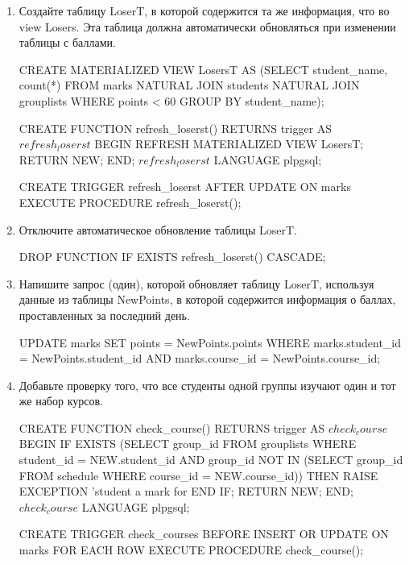 \documentclass[10pt, a4paper]{article}
\begin{document}
\begin{enumerate}
	\item {Создайте таблицу \textsf{LoserT}, в которой содержится та же информация, что во view \textsf{Losers}. Эта таблица должна автоматически обновляться при изменении таблицы с баллами.

	\begin{sql}
CREATE MATERIALIZED VIEW LosersT AS
	(SELECT student_name, count(*) FROM
	marks NATURAL JOIN students NATURAL JOIN grouplists
		WHERE points < 60 GROUP BY student_name);

CREATE FUNCTION refresh_loserst() RETURNS trigger AS $refresh_loserst$ 
BEGIN
	REFRESH MATERIALIZED VIEW LosersT;
	RETURN NEW;
END; 
$refresh_loserst$ LANGUAGE plpgsql;

CREATE TRIGGER refresh_loserst AFTER UPDATE ON marks
	EXECUTE PROCEDURE refresh_loserst();
	\end{sql}
	}

	\item {Отключите автоматическое обновление таблицы \textsf{LoserT}.

	\begin{sql}
DROP FUNCTION IF EXISTS refresh_loserst() CASCADE;
	\end{sql}
	}

	\item {Напишите запрос (один), которой обновляет таблицу \textsf{LoserT}, используя данные из таблицы \textsf{NewPoints}, в которой содержится информация о баллах, проставленных за последний день.

\begin{sql}
UPDATE marks SET points = NewPoints.points
	WHERE marks.student_id = NewPoints.student_id
	AND marks.course_id = NewPoints.course_id;
\end{sql}
	}

	\item {Добавьте проверку того, что все студенты одной группы изучают один и тот же набор курсов.

\begin{sql}
CREATE FUNCTION check_course() RETURNS trigger AS $check_course$ 
BEGIN
	IF EXISTS (SELECT group_id FROM grouplists
		WHERE student_id = NEW.student_id
		AND group_id NOT IN
			(SELECT group_id FROM schedule
				WHERE course_id = NEW.course_id)) THEN	
		RAISE EXCEPTION 'student %
		a mark for %
	END IF;
	RETURN NEW;
END; 
$check_course$ LANGUAGE plpgsql;

CREATE TRIGGER check_courses BEFORE INSERT OR UPDATE ON marks
	FOR EACH ROW EXECUTE PROCEDURE check_course();
\end{sql}
	}


\end{enumerate}
\end{document}
